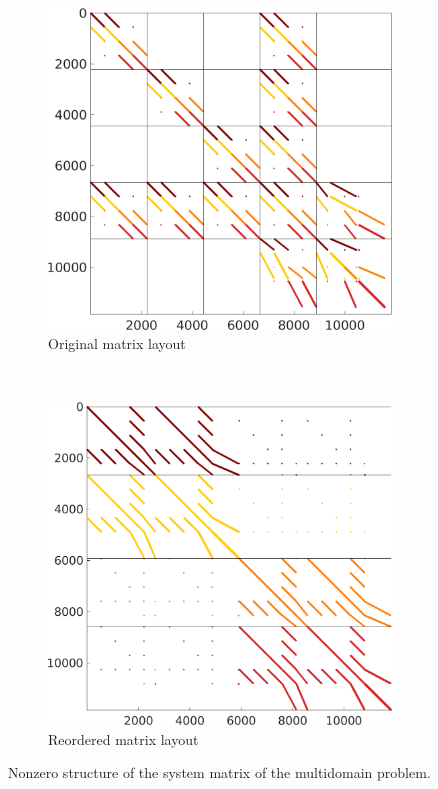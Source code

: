 
\begin{figure}%
  \centering%
  \begin{subfigure}[t]{0.49\textwidth}%
    \centering%
    \includegraphics[width=\textwidth]{images/implementation/original_matrix.png}
    \caption{Original matrix layout}%
    \label{fig:original_matrix}%
  \end{subfigure}
  \,
  \begin{subfigure}[t]{0.49\textwidth}%
    \centering%
    \includegraphics[width=\textwidth]{images/implementation/reordered_matrix.png}
    \caption{Reordered matrix layout}%
    \label{fig:reordered_matrix}%
  \end{subfigure}
  \caption{Nonzero structure of the system matrix of the multidomain problem.}%
  \label{fig:original_reordered_matrix}%
\end{figure}%

